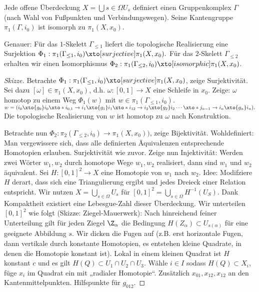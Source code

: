 \begin{st}
    Jede offene Überdeckung $X = \bigcup{s \in \Omega} U_s$ definiert einen Gruppenkomplex $\Gamma$ (nach Wahl von Fußpunkten und Verbindungswegen).
    Seine Kantengruppe $\pi_1(\Gamma, i_0)$ ist isomorph zu $\pi_1(X, x_0)$.

    Genauer: Für das $1$-Skelett $\Gamma_{\le 1}$ liefert die topologische Realisierung eine Surjektion
    \begin{math}
        \Phi_1: \pi_1(\Gamma_{\le 1}, i_0) \xto[surjective] \pi_1(X, x_0).
    \end{math}
    Für das $2$-Skelett $\Gamma_{\le 2}$ erhalten wir einen Isomorphismus $\Phi_2 : \pi_1(\Gamma_{\le 2}, i_0) \xto[isomorphic] \pi_1(X, x_0)$.
    \begin{proof}[Skizze]
        Betrachte $\Phi_1: \pi_1(\Gamma_{\le 1}, i_0) \xto[surjective] \pi_1(X, x_0)$, zeige Surjektivität.
        Sei dazu $[\omega] \in \pi_1(X, x_0)$, d.h. $\omega:[0,1] \to X$ eine Schleife in $x_0$.
        Zeige: $\omega$ homotop zu einem Weg $\Phi_1(w)$ mit $w \in \pi_1(\Gamma_{\le 1}, i_0)$.
        \begin{math}
            w = (i_0 \xto{g_0} i_0 \xto* i_{0,1} \to i_1 \xto{g_1} i_1 \xto* i_{12} \to i_2 \xto{g_2} i_2 \dotsb \xto* j_{n-1} \to i_n \xto{g_n} i_n).
        \end{math}
        Die topologische Realisierung von $w$ ist homotop zu $\omega$ nach Konstruktion.

        Betrachte nun $\Phi_2: \pi_2(\Gamma_{\le 2}, i_0) \to \pi_1(X, x_0))$, zeige Bijektivität.
        Wohldefiniert: Man vergewissere sich, dass alle definierten Äquivalenzen entsprechende Homotopien erlauben.
        Surjektivität wie zuvor.
        Zeige nun Injektivität: Werden zwei Wörter $w_1, w_2$ durch homotope Wege $w_1, w_2$ realisiert, dann sind $w_1$ und $w_2$ äquivalent.
        Sei $H: [0,1]^2 \to X$ eine Homotopie von $w_1$ nach $w_2$.
        Idee: Modifziere $H$ derart, dass sich eine Triangulierung ergibt und jedes Dreieck einer Relation entspricht.
        Wir nutzen $X = \bigcup_{s \in \Omega} U_s$ für $[0,1]^2 = \bigcup_{s \in \Omega} H^{-1}(U_S)$.
        Dank Kompaktheit existiert eine Lebesgue-Zahl dieser Überdeckung.
        Wir unterteilen $[0,1]^2$ wie folgt (Skizze: Ziegel-Mauerwerk):
        Nach hinreichend feiner Unterteilung gilt für jeden Ziegel $\Z_\alpha$ die Bedingung $H(Z_\alpha) \subset U_{s(\alpha)}$ für eine geeignete Abbildung $s$.
        Wir dicken die Fugen auf (z.B. erst horizontale Fugen, dann vertikale durch konstante Homotopien, es entstehen kleine Quadrate, in denen die Homotopie konstant ist).
        Lokal in einem kleinen Quadrat ist $H$ konstant $c$ und es gilt $H(Q) \subset U_1 \cap U_2 \cap U_3$.
        Wähle $i \in I$ sodass $H(Q) \subset X_i$, füge $x_i$ im Quadrat ein mit „radialer Homotopie“.
        Zusätzlich $x_{01}, x_{12}, x_{12}$ an den Kantenmittelpunkten.
        Hilfspunkte für $g_{012}$.


\end{proof}
\end{st}
